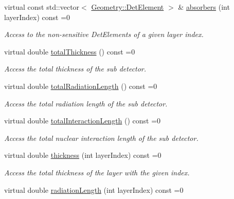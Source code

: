 \begin{DoxyCompactItemize}
virtual const std::vector$<$ \hyperlink{class_d_d4hep_1_1_geometry_1_1_det_element}{Geometry::DetElement} $>$ \& \hyperlink{class_d_d4hep_1_1_d_d_rec_1_1_layering_extension_a1204ac80c52fbca9ce3f71e2b3662eab}{absorbers} (int layerIndex) const =0
\begin{DoxyCompactList}\small\item\em Access to the non-\/sensitive DetElements of a given layer index. \item\end{DoxyCompactList}\item 
virtual double \hyperlink{class_d_d4hep_1_1_d_d_rec_1_1_layering_extension_a287dd58b108f5d121bc55c91009454ed}{totalThickness} () const =0
\begin{DoxyCompactList}\small\item\em Access the total thickness of the sub detector. \item\end{DoxyCompactList}\item 
virtual double \hyperlink{class_d_d4hep_1_1_d_d_rec_1_1_layering_extension_a710dca345926458ed3ab3abc06490ee9}{totalRadiationLength} () const =0
\begin{DoxyCompactList}\small\item\em Access the total radiation length of the sub detector. \item\end{DoxyCompactList}\item 
virtual double \hyperlink{class_d_d4hep_1_1_d_d_rec_1_1_layering_extension_aa5440bf9dc11305a785765ca155437fa}{totalInteractionLength} () const =0
\begin{DoxyCompactList}\small\item\em Access the total nuclear interaction length of the sub detector. \item\end{DoxyCompactList}\item 
virtual double \hyperlink{class_d_d4hep_1_1_d_d_rec_1_1_layering_extension_a6510f43f195374e6adfb4312c27da450}{thickness} (int layerIndex) const =0
\begin{DoxyCompactList}\small\item\em Access the total thickness of the layer with the given index. \item\end{DoxyCompactList}\item 
virtual double \hyperlink{class_d_d4hep_1_1_d_d_rec_1_1_layering_extension_adf915de4949eb6f0406045b4b38dd469}{radiationLength} (int layerIndex) const =0

\end{DoxyCompactItemize}
